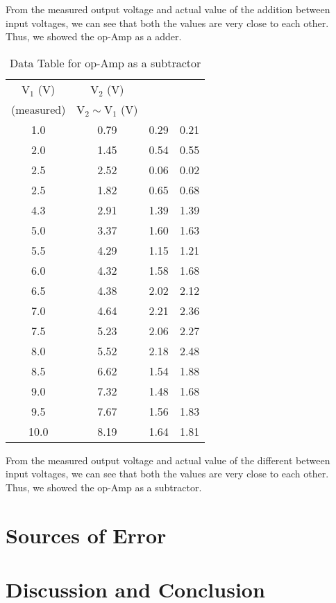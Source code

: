 \documentclass{scrartcl}
\begin{document}
    \noindent
    From the measured output voltage and actual value of the addition between input voltages, we can see that both the values are very close to each other. Thus, we showed the op-Amp as a adder.
    \begin{table}[H]
        \centering
        \begin{tabular}{|c|c|c|c|}
        \hline
        $\mathrm{V_1}$ (\si{V}) & $\mathrm{V_2}$ (\si{V}) & \thead{$\mathrm{V_{\text{out}}}\si{(V)}$\\ (measured)} & $\mathrm{V_2} \sim \mathrm{V_1}$ (\si{V}) \\ \hline
        1.0    & 0.79 & 0.29 & 0.21 \\ \hline
        2.0    & 1.45 & 0.54 & 0.55 \\ \hline
        2.5  & 2.52 & 0.06 & 0.02 \\ \hline
        2.5  & 1.82 & 0.65 & 0.68 \\ \hline
        4.3  & 2.91 & 1.39 & 1.39 \\ \hline
        5.0    & 3.37 & 1.60  & 1.63 \\ \hline
        5.5  & 4.29 & 1.15 & 1.21 \\ \hline
        6.0   & 4.32 & 1.58 & 1.68 \\ \hline
        6.5  & 4.38 & 2.02 & 2.12 \\ \hline
        7.0    & 4.64 & 2.21 & 2.36 \\ \hline
        7.5  & 5.23 & 2.06 & 2.27 \\ \hline
        8.0    & 5.52 & 2.18 & 2.48 \\ \hline
        8.5  & 6.62 & 1.54 & 1.88 \\ \hline
        9.0   & 7.32 & 1.48 & 1.68 \\ \hline
        9.5  & 7.67 & 1.56 & 1.83 \\ \hline
        10.0   & 8.19 & 1.64 & 1.81 \\ \hline
        \end{tabular}
        \caption{Data Table for op-Amp as a subtractor}
        \label{tab:voltage_measurements_diff}
        \end{table}
\noindent
From the measured output voltage and actual value of the different between input voltages, we can see that both the values are very close to each other. Thus, we showed the op-Amp as a subtractor.


\section{Sources of Error}
\section{Discussion and Conclusion} 
\end{document}
